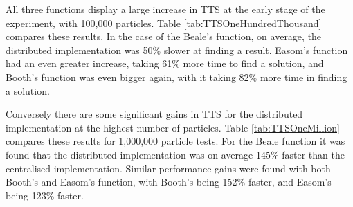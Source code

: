 \documentclass[oneside,12pt]{book}
\begin{document}
All three functions display a large increase in TTS at the early stage of the experiment, with 100,000 particles. Table \ref{tab:TTSOneHundredThousand} compares these results. In the case of the Beale's function, on average, the distributed implementation was 50\% slower at finding a result. Easom's function had an even greater increase, taking 61\% more time to find a solution, and Booth's function was even bigger again, with it taking 82\% more time in finding a solution. 

\begin{table}[H]
  \caption{TTS Results for 100,000 Particles}    
  \label{tab:TTSOneHundredThousand}%
\end{table}%

Conversely there are some significant gains in TTS for the distributed implementation at the highest number of particles. Table \ref{tab:TTSOneMillion} compares these results for 1,000,000 particle tests. For the Beale function it was found that the distributed implementation was on average 145\% faster than the centralised implementation. Similar performance gains were found with both Booth's and Easom's function, with Booth's being 152\% faster, and Easom's being 123\% faster. 
\end{document}
